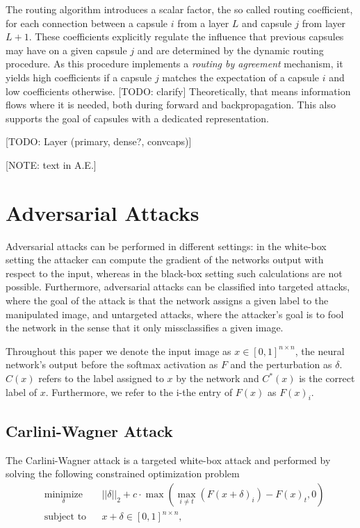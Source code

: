 \documentclass{article}
\begin{document}
The routing algorithm introduces a scalar factor, the so called routing coefficient, for each connection between a capsule $i$ from a layer $L$ and capsule $j$ from layer $L+1$. These coefficients explicitly regulate the influence that previous capsules may have on a given capsule $j$ and are determined by the dynamic routing procedure. As this procedure implements a \textit{routing by agreement} mechanism, it yields high coefficients if a capsule $j$ matches the expectation of a capsule $i$ and low coefficients otherwise. [TODO: clarify] Theoretically, that means information flows where it is needed, both during forward and backpropagation. This also supports the goal of capsules with a dedicated representation.

[TODO: Layer (primary, dense?, convcaps)]

[NOTE: text in A.E.]



\section{Adversarial Attacks}
\label{lab:attacks}

Adversarial attacks can be performed in different settings: in the white-box setting the attacker can compute the gradient of the networks output with respect to the input, whereas in the black-box setting such calculations are not possible. Furthermore, adversarial attacks can be classified into targeted attacks, where the goal of the attack is that the network assigns a given label to the manipulated image, and untargeted attacks, where the attacker's goal is to fool the network in the sense that it only missclassifies a given image.

Throughout this paper we denote the input image as $x\in [0,1]^{n\times n}$, the neural network's output before the softmax activation as $F$ and the perturbation as $\delta$. $C(x)$ refers to the label assigned to $x$ by the network and $C^*(x)$ is the correct label of $x$. Furthermore, we refer to the i-the entry of $F(x)$ as $F(x)_i$.

\subsection{Carlini-Wagner Attack}

The Carlini-Wagner attack \cite{carlini} is a targeted white-box attack and performed by solving the following constrained optimization problem
\begin{equation}
	\begin{aligned}
	& \underset{\delta}{\text{minimize}}
	& & ||\delta||_2 + c \cdot \max(\max_{i\neq t}(F(x+\delta)_i)-F(x)_t, 0) \\
	& \text{subject to}
	& & x+\delta \in [0,1]^{n \times n},
	\end{aligned}
\end{equation}
\end{document}
